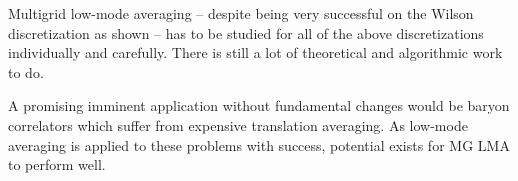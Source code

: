Multigrid low-mode averaging -- despite being very successful on the Wilson discretization as shown -- has to be studied for all of the above discretizations individually and carefully.
There is still a lot of theoretical and algorithmic work to do.

A promising imminent application without fundamental changes would be baryon correlators which suffer from expensive translation averaging.
As low-mode averaging is applied to these problems with success, potential exists for MG LMA to perform well.


